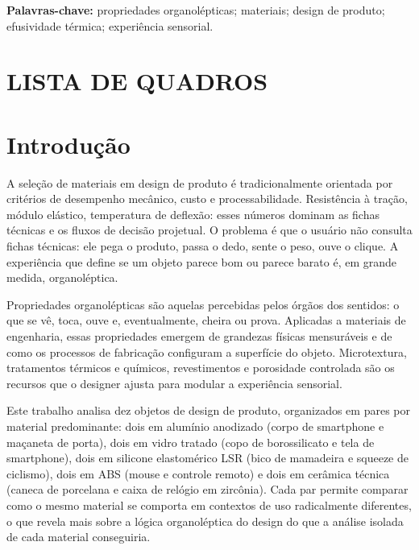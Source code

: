 \documentclass[
  12pt,
  a4paper,
  oneside,
  brazil,
  chapter=TITLE
]{article}
\makeatletter
\newcommand{\secbreak}{\clearpage}
\let\oldsection\section
\renewcommand{\section}{\secbreak\oldsection}
\renewcommand{\listofquadros}{%
  \section*{LISTA DE QUADROS}%
  \@starttoc{loq}%
}
\makeatother
\begin{document}
\vspace{1em}
\noindent\textbf{Palavras-chave:} propriedades organolépticas; materiais; design de produto;
efusividade térmica; experiência sensorial.

\clearpage
\thispagestyle{empty}
\listofquadros

\clearpage
\thispagestyle{empty}
\tableofcontents


\section{Introdução}

A seleção de materiais em design de produto é tradicionalmente orientada por critérios de
desempenho mecânico, custo e processabilidade. Resistência à tração, módulo elástico,
temperatura de deflexão: esses números dominam as fichas técnicas e os fluxos de decisão
projetual. O problema é que o usuário não consulta fichas técnicas: ele pega o produto,
passa o dedo, sente o peso, ouve o clique. A experiência que define se um objeto parece
bom ou parece barato é, em grande medida, organoléptica.

Propriedades organolépticas são aquelas percebidas pelos órgãos dos sentidos: o que se vê,
toca, ouve e, eventualmente, cheira ou prova. Aplicadas a materiais de engenharia, essas
propriedades emergem de grandezas físicas mensuráveis e de como os processos de fabricação
configuram a superfície do objeto. Microtextura, tratamentos térmicos e químicos,
revestimentos e porosidade controlada são os recursos que o designer ajusta para modular
a experiência sensorial.

Este trabalho analisa dez objetos de design de produto, organizados em pares por material
predominante: dois em alumínio anodizado (corpo de smartphone e maçaneta de porta), dois
em vidro tratado (copo de borossilicato e tela de smartphone), dois em silicone elastomérico
LSR (bico de mamadeira e squeeze de ciclismo), dois em ABS (mouse e controle remoto) e dois
em cerâmica técnica (caneca de porcelana e caixa de relógio em zircônia). Cada par permite
comparar como o mesmo material se comporta em contextos de uso radicalmente diferentes,
o que revela mais sobre a lógica organoléptica do design do que a análise isolada de cada
material conseguiria.
\end{document}
